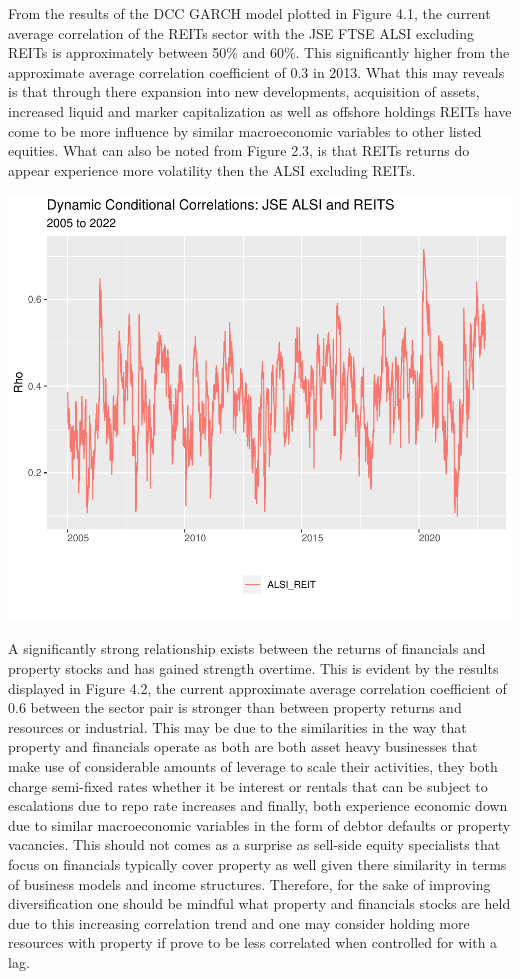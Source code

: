 \documentclass[11pt,preprint, authoryear]{elsarticle}
\let\origfigure\figure
\let\endorigfigure\endfigure
\renewenvironment{figure}[1][2] {
    \expandafter\origfigure\expandafter[H]
} {
    \endorigfigure
}
\numberwithin{equation}{section}
\numberwithin{figure}{section}
\numberwithin{table}{section}
\begin{document}
From the results of the DCC GARCH model plotted in Figure 4.1, the
current average correlation of the REITs sector with the JSE FTSE ALSI
excluding REITs is approximately between 50\% and 60\%. This
significantly higher from the approximate average correlation
coefficient of 0.3 in 2013. What this may reveals is that through there
expansion into new developments, acquisition of assets, increased liquid
and marker capitalization as well as offshore holdings REITs have come
to be more influence by similar macroeconomic variables to other listed
equities. What can also be noted from Figure 2.3, is that REITs returns
do appear experience more volatility then the ALSI excluding REITs.

\begin{figure}
\centering
\includegraphics{Fin_Metrics_Project_files/figure-latex/unnamed-chunk-6-1.pdf}
\caption{Dynamic Conditional Correlations Graph}
\end{figure}

A significantly strong relationship exists between the returns of
financials and property stocks and has gained strength overtime. This is
evident by the results displayed in Figure 4.2, the current approximate
average correlation coefficient of 0.6 between the sector pair is
stronger than between property returns and resources or industrial. This
may be due to the similarities in the way that property and financials
operate as both are both asset heavy businesses that make use of
considerable amounts of leverage to scale their activities, they both
charge semi-fixed rates whether it be interest or rentals that can be
subject to escalations due to repo rate increases and finally, both
experience economic down due to similar macroeconomic variables in the
form of debtor defaults or property vacancies. This should not comes as
a surprise as sell-side equity specialists that focus on financials
typically cover property as well given there similarity in terms of
business models and income structures. Therefore, for the sake of
improving diversification one should be mindful what property and
financials stocks are held due to this increasing correlation trend and
one may consider holding more resources with property if prove to be
less correlated when controlled for with a lag.
\end{document}
